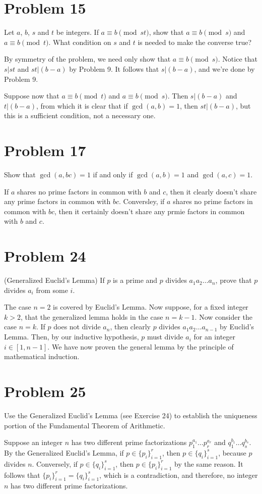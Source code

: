 \documentclass[12pt]{article}
\begin{document}
\section*{Problem 15}

Let $a$, $b$, $s$ and $t$ be integers.  If $a\equiv b\pmod{st}$,
show that $a\equiv b\pmod s$ and $a\equiv b\pmod t$.  What condition
on $s$ and $t$ is needed to make the converse true?

By symmetry of the problem, we need only show that $a\equiv b\pmod{s}$.
Notice that $s|st$ and $st|(b-a)$ by Problem 9.  It follows that $s|(b-a)$, and we're done by Problem 9.

Suppose now that $a\equiv b\pmod t$ and $a\equiv b\pmod s$.
Then $s|(b-a)$ and $t|(b-a)$, from which it is clear that if $\gcd(a,b)=1$,
then $st|(b-a)$, but this is a sufficient condition, not a necessary one.

\section*{Problem 17}

Show that $\gcd(a,bc)=1$ if and only if $\gcd(a,b)=1$ and $\gcd(a,c)=1$.

If $a$ shares no prime factors in common with $b$ and $c$, then it clearly
doesn't share any prime factors in common with $bc$.  Conversley, if $a$
shares no prime factors in common with $bc$, then it certainly doesn't
share any prmie factors in common with $b$ and $c$.

\section*{Problem 24}

(Generalized Euclid's Lemma)  If $p$ is a prime and $p$ divides
$a_1a_2\dots a_n$, prove that $p$ divides $a_i$ from some $i$.

The case $n=2$ is covered by Euclid's Lemma.  Now suppose, for a fixed integer
$k>2$, that the generalized lemma holds in the case $n=k-1$.  Now
consider the case $n=k$.  If $p$ does not divide $a_n$, then
clearly $p$ divides $a_1a_2\dots a_{n-1}$ by Euclid's Lemma.
Then, by our inductive hypothesis, $p$ must divide $a_i$ for an
integer $i\in[1,n-1]$.  We have now proven the general lemma
by the principle of mathematical induction.

\section*{Problem 25}

Use the Generalized Euclid's Lemma (see Exercise 24) to establish the
uniqueness portion of the Fundamental Theorem of Arithmetic.

Suppose an integer $n$ has two different prime factorizations $p_1^{a_1}\dots p_r^{a_r}$
and $q_1^{b_1}\dots q_s^{b_s}$.  By the Generalized Euclid's Lemma, if
$p\in\{p_i\}_{i=1}^r$, then $p\in\{q_i\}_{i=1}^s$, because $p$ divides $n$.
Conversely, if $p\in\{q_i\}_{i=1}^s$, then $p\in\{p_i\}_{i=1}^r$ by the same reason.
It follows that $\{p_i\}_{i=1}^r=\{q_i\}_{i=1}^s$, which is a contradiction, and
therefore, no integer $n$ has two different prime factorizations.
\end{document}
